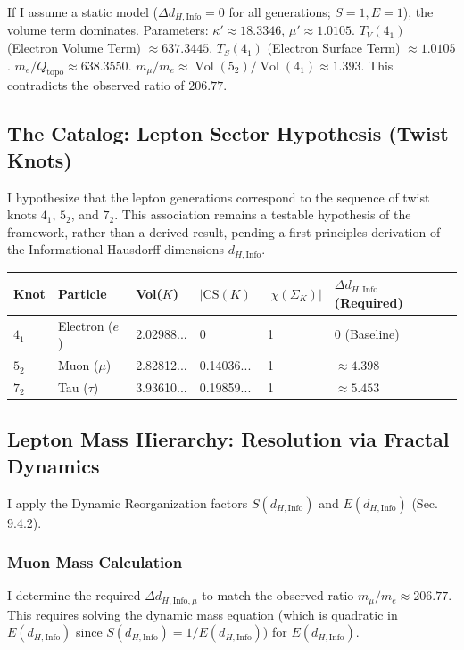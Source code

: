 \documentclass[11pt, a4paper]{article}
\theoremstyle{definition}
\theoremstyle{definition}
\newcommand{\Qtopo}{Q_{\text{topo}}}
\newcommand{\Vol}{\operatorname{Vol}}
\newcommand{\V}[1]{\Vol(#1)}
\newcommand{\dHInfo}{d_{H,\mathrm{Info}}} %
\begin{document}
If I assume a static model ($\Delta \dHInfo=0$ for all generations; $S=1, E=1$), the volume term dominates.
Parameters: $\kappa' \approx 18.3346$, $\mu' \approx 1.0105$.
$T_V(4_1)$ (Electron Volume Term) $\approx 637.3445$.
$T_S(4_1)$ (Electron Surface Term) $\approx 1.0105$.
$m_e/\Qtopo \approx 638.3550$.
$m_\mu/m_e \approx \V{5_2}/\V{4_1} \approx 1.393$. This contradicts the observed ratio of $206.77$.

\subsection{The Catalog: Lepton Sector Hypothesis (Twist Knots)}

I hypothesize that the lepton generations correspond to the sequence of twist knots $4_1$, $5_2$, and $7_2$. This association remains a testable hypothesis of the framework, rather than a derived result, pending a first-principles derivation of the Informational Hausdorff dimensions $\dHInfo$.

\begin{longtable}{|l|l|l|l|l|l|}
\hline
\textbf{Knot} & \textbf{Particle} & \textbf{Vol($K$)} & \textbf{$|\mathrm{CS}(K)|$} & \textbf{$|\chi(\Sigma_K)|$} & \textbf{$\Delta \dHInfo$ (Required)} \\
\hline
\endhead
$4_1$ & Electron ($e$) & 2.02988... & 0 & 1 & 0 (Baseline) \\
$5_2$ & Muon ($\mu$) & 2.82812... & 0.14036... & 1 & $\approx 4.398$ \\
$7_2$ & Tau ($\tau$) & 3.93610... & 0.19859... & 1 & $\approx 5.453$ \\
\hline
\end{longtable}

\subsection{Lepton Mass Hierarchy: Resolution via Fractal Dynamics}

I apply the Dynamic Reorganization factors $S(\dHInfo)$ and $E(\dHInfo)$ (Sec. 9.4.2).

\subsubsection{Muon Mass Calculation}
I determine the required $\Delta d_{H, \text{Info}, \mu}$ to match the observed ratio $m_\mu/m_e \approx 206.77$. This requires solving the dynamic mass equation (which is quadratic in $E(\dHInfo)$ since $S(\dHInfo)=1/E(\dHInfo)$) for $E(\dHInfo)$.
\end{document}
